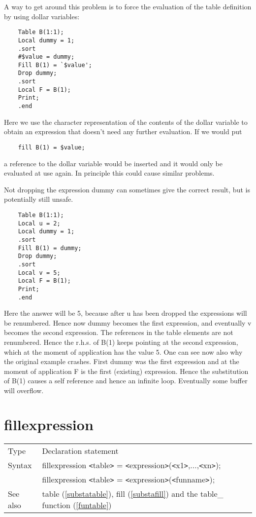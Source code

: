 \noindent A way to get around this problem is to force the evaluation of 
the table definition by using dollar 
variables:
\begin{verbatim}
    Table B(1:1);
    Local dummy = 1;
    .sort
    #$value = dummy;
    Fill B(1) = `$value';
    Drop dummy;
    .sort
    Local F = B(1);
    Print;
    .end
\end{verbatim}
Here we use the character representation of the contents of the dollar 
variable to obtain an expression that doesn't need any further evaluation. 
If we would put
\begin{verbatim}
    fill B(1) = $value;
\end{verbatim}
a reference to the dollar variable would be inserted and it would only be 
evaluated at use again. In principle this could cause similar problems.

\noindent Not dropping the expression dummy can sometimes give the correct 
result, but is potentially still unsafe. 
\begin{verbatim}
    Table B(1:1);
    Local u = 2;
    Local dummy = 1;
    .sort
    Fill B(1) = dummy;
    Drop dummy;
    .sort
    Local v = 5;
    Local F = B(1);
    Print;
    .end
\end{verbatim}
Here the answer will be 5, because after u has been dropped the expressions 
will be renumbered. Hence now dummy becomes the first expression, and 
eventually v becomes the second expression. The references in the table 
elements are not renumbered. Hence the r.h.s. of B(1) keeps pointing at the 
second expression, which at the moment of application has the value 5. One 
can see now also why the original example crashes. First dummy was the 
first expression and at the moment of application F is the first (existing) 
expression. Hence the substitution of B(1) causes a self reference and 
hence an infinite loop. Eventually some buffer will 
overflow.
\vspace{10mm}

 
\section{fillexpression}
\label{substafillexpression}

\noindent \begin{tabular}{ll}
Type & Declaration statement\\
Syntax & fillexpression {\tt<}table{\tt>} = {\tt<}expression{\tt>}({\tt<}x1{\tt>},...,{\tt<}xn{\tt>});
\\     & fillexpression {\tt<}table{\tt>} = {\tt<}expression{\tt>}({\tt<}funname{\tt>});
\\ See also & table (\ref{substatable}), 
                fill (\ref{substafill}) and the table\_ function 
(\ref{funtable})
\end{tabular}\vspace{4mm}

